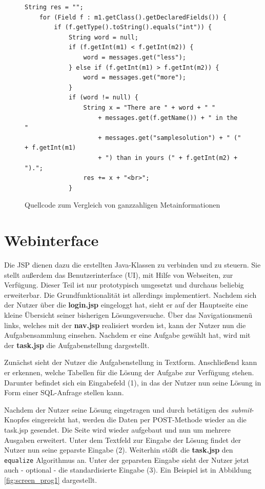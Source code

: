 \begin{figure}[h]
\lstset{language=Java,tabsize=2}
\begin{lstlisting}
String res = "";
	for (Field f : m1.getClass().getDeclaredFields()) {
		if (f.getType().toString().equals("int")) {
			String word = null;
			if (f.getInt(m1) < f.getInt(m2)) {
				word = messages.get("less");
			} else if (f.getInt(m1) > f.getInt(m2)) {
				word = messages.get("more");
			}
			if (word != null) {
				String x = "There are " + word + " "
					+ messages.get(f.getName()) + " in the "
					+ messages.get("samplesolution") + " (" + f.getInt(m1)
					+ ") than in yours (" + f.getInt(m2) + ").";
				res += x + "<br>";
			}
\end{lstlisting}
\caption{Quellcode zum Vergleich von ganzzahligen Metainformationen}
\label{fig:comparecode}
\end{figure}

\section{Webinterface}
\label{sec:webinterface}

Die JSP dienen dazu die erstellten Java-Klassen zu verbinden und zu steuern. Sie stellt außerdem das Benutzerinterface (UI), mit Hilfe von Webseiten, zur Verfügung. Dieser Teil ist nur prototypisch umgesetzt und durchaus beliebig erweiterbar. Die Grundfunktionalität ist allerdings implementiert. Nachdem sich der Nutzer über die \textbf{login.jsp} eingeloggt hat, sieht er auf der Hauptseite eine kleine Übersicht seiner bisherigen Lösungsversuche. Über das Navigationsmenü links, welches mit der \textbf{nav.jsp} realisiert worden ist, kann der Nutzer nun die Aufgabensammlung einsehen. Nachdem er eine Aufgabe gewählt hat, wird mit der \textbf{task.jsp} die Aufgabenstellung dargestellt.

Zunächst sieht der Nutzer die Aufgabenstellung in Textform. Anschließend kann er erkennen, welche Tabellen für die Lösung der Aufgabe zur Verfügung stehen. Darunter befindet sich ein Eingabefeld (1), in das der Nutzer nun seine Lösung in Form einer SQL-Anfrage stellen kann.

Nachdem der Nutzer seine Lösung eingetragen und durch betätigen des \textit{submit}-Knopfes eingereicht hat, werden die Daten per POST-Methode wieder an die task.jsp gesendet. Die Seite wird wieder aufgebaut und nun um mehrere Ausgaben erweitert. Unter dem Textfeld zur Eingabe der Lösung findet der Nutzer nun seine geparste Eingabe (2). Weiterhin stößt die \textbf{task.jsp} den \verb|equalize| Algorithmus an. Unter der geparsten Eingabe sieht der Nutzer jetzt auch - optional - die standardisierte Eingabe (3). Ein Beispiel ist in Abbildung \ref{fig:screen_prog1} dargestellt.

